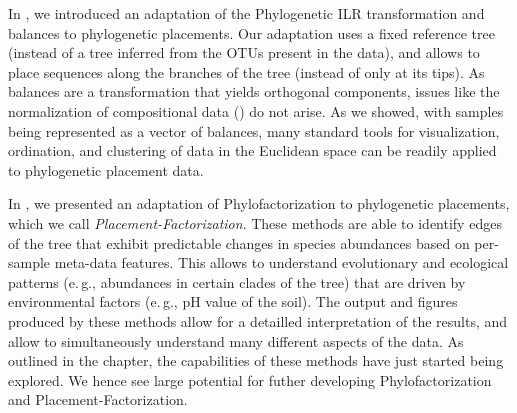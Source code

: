 In , we introduced an adaptation of the Phylogenetic ILR transformation and balances \cite{Silverman2017}
to phylogenetic placements.
Our adaptation uses a fixed reference tree (instead of a tree inferred from the OTUs present in the data),
and allows to place sequences along the branches of the tree (instead of only at its tips).
As balances are a transformation that yields orthogonal components, %
issues like the normalization of compositional data
() do not arise.
As we showed, with samples being represented as a vector of balances,
many standard tools for visualization, ordination, and clustering of data in the Euclidean space
can be readily applied to phylogenetic placement data.

In , we presented an adaptation of Phylofactorization \cite{Washburne2017a} to phylogenetic placements,
which we call \emph{Placement-Factorization}.
These methods are able to identify edges of the tree that exhibit predictable changes in species abundances
based on per-sample meta-data features.
This allows to understand evolutionary and ecological patterns (e.\,g., abundances in certain clades of the tree)
that are driven by environmental factors (e.\,g., pH value of the soil).
The output and figures produced by these methods allow for a detailled interpretation of the results,
and allow to simultaneously understand many different aspects of the data.
As outlined in the chapter, the capabilities of these methods have just started being explored.
We hence see large potential for futher developing Phylofactorization and Placement-Factorization.

